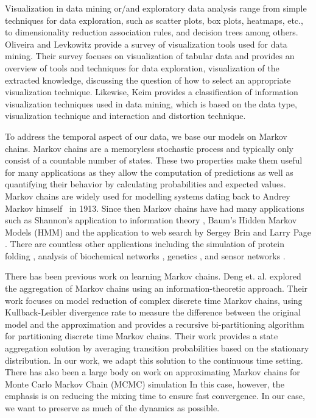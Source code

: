 Visualization in data mining or/and exploratory data analysis range from simple techniques for data exploration, such as
scatter plots, box plots, heatmaps, etc., to dimensionality reduction%
association rules, and decision trees among others.  %
%
Oliveira and Levkowitz \cite{1207445} provide a survey of visualization tools used for data mining. Their survey focuses
on visualization of tabular data and provides an overview of tools and techniques for data exploration,
visualization of the extracted knowledge, discussing the question of how to select an appropriate visualization
technique.
%
Likewise, Keim \cite{981847} provides a classification of information visualization techniques used in data mining, which is based on
the data type, visualization technique and interaction and distortion technique.

To address the temporal aspect of our data, we base our models on  Markov chains. Markov chains are a memoryless stochastic process and typically only consist of a countable number of states. These two properties make them useful for many applications as they allow the computation of predictions as
well as quantifying their behavior by calculating probabilities and expected values. Markov chains are widely used for modelling systems dating back to Andrey Markov himself~\cite{markov13} in 1913. Since then
Markov chains have had many applications such as Shannon's application to information theory \cite{Shannon:1948},
Baum's Hidden Markov Models (HMM) \cite{baum1970} and the application to web search by Sergey Brin and Larry Page \cite{Lawrence981}. 
%
There are countless other applications including the simulation of protein folding \cite{pande-beauchamp-bowman:2010:methods:markov-model-review},
analysis of biochemical networks \cite{Ciocchetta2009145},
genetics \cite{Huelsenbeck2310}, and 
sensor networks \cite{DBLP:journals/corr/AlsheikhHNTL15}.%

There has been previous work on learning Markov chains. Deng et. al. \cite{5746509} explored the aggregation of Markov chains using an information-theoretic
approach. Their work focuses on model reduction of complex discrete time Markov chains, using Kullback-Leibler divergence
rate to measure the difference between the original model and the approximation and provides a recursive bi-partitioning
algorithm for partitioning discrete time Markov chains. Their work provides a state aggregation solution by averaging
transition probabilities based on the stationary distribution. In our work, we adapt this solution to the continuous time
setting.
%
There has also been a large body on work on approximating Markov chains for Monte Carlo Markov Chain (MCMC) simulation \cite{RSSD:RSSD117,HASTINGS01041970}
In this case, however, the emphasis is on reducing the mixing time to ensure fast convergence. In our case, we want to preserve as much of the dynamics as possible. 


